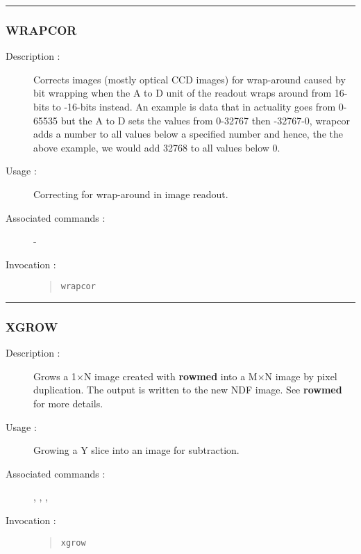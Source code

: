 \hrule 
\subsubsection*{\label{WRAPCOR}WRAPCOR}

\begin{description}

\item[Description :] Corrects images (mostly optical CCD images) for
wrap-around caused by bit wrapping when the A to D unit of the readout
wraps around from 16-bits to -16-bits instead.  An example is data that
in actuality goes from 0-65535 but the A to D sets the values from
0-32767 then -32767-0, wrapcor adds a number to all values below a
specified number and hence, the the above example, we would add 32768
to all values below 0.

\item[Usage :] Correcting for wrap-around in image readout.
\item[Associated commands :] -
\item[Invocation :]

\begin{quote}{\tt  wrapcor }\end{quote}

\end{description}

\hrule 
\subsubsection*{\label{XGROW}XGROW}

\begin{description}

\item[Description :] Grows a 1$\times$N image created with {\bf rowmed}
into a M$\times$N image by pixel duplication.  The output is written to
the new NDF image.  See {\bf rowmed} for more details.

\item[Usage :] Growing a Y slice into an image for subtraction.

\item[Associated commands :] {\tt {}}, 
{\tt {}}, {\tt {}}, 
{\tt {}}

\item[Invocation :]

\begin{quote}{\tt xgrow }\end{quote}

\end{description}

